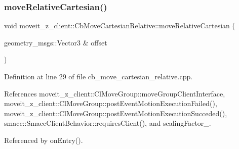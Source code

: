 \subsubsection{\texorpdfstring{move\+Relative\+Cartesian()}{moveRelativeCartesian()}}
{\footnotesize\ttfamily void moveit\+\_\+z\+\_\+client\+::\+Cb\+Move\+Cartesian\+Relative\+::move\+Relative\+Cartesian (\begin{DoxyParamCaption}\item[{geometry\+\_\+msgs\+::\+Vector3 \&}]{offset }\end{DoxyParamCaption})}



Definition at line 29 of file cb\+\_\+move\+\_\+cartesian\+\_\+relative.\+cpp.



References moveit\+\_\+z\+\_\+client\+::\+Cl\+Move\+Group\+::move\+Group\+Client\+Interface, moveit\+\_\+z\+\_\+client\+::\+Cl\+Move\+Group\+::post\+Event\+Motion\+Execution\+Failed(), moveit\+\_\+z\+\_\+client\+::\+Cl\+Move\+Group\+::post\+Event\+Motion\+Execution\+Succeded(), smacc\+::\+Smacc\+Client\+Behavior\+::requires\+Client(), and scaling\+Factor\+\_\+.



Referenced by on\+Entry().


